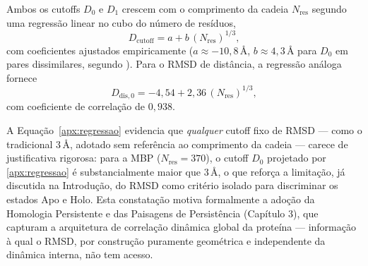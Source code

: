 \documentclass[12pt, a4paper]{article}
\theoremstyle{plain}
\theoremstyle{definition}
\theoremstyle{remark}
\newcommand{\ident}{\hspace{2em}}
\begin{document}
\ident Ambos os cutoffs $D_0$ e $D_1$ crescem com o comprimento da cadeia
$N_{\mathrm{res}}$ segundo uma regressão linear no cubo do número de
resíduos,
\begin{equation*}
    D_{\text{cutoff}} = a + b\,(N_{\mathrm{res}})^{1/3},
    \label{apx:regressao}
\end{equation*}
com coeficientes ajustados empiricamente ($a\approx -10{,}8\,\text{\AA}$,
$b\approx 4{,}3\,\text{\AA}$ para $D_0$ em pares dissimilares, segundo
\cite{maiorov1994}). Para o RMSD de distância, a regressão análoga fornece
\begin{equation*}
    D_{\mathrm{dis},0} = -4{,}54 + 2{,}36\,(N_{\mathrm{res}})^{1/3},
    \label{apx:regressao_dis}
\end{equation*}
com coeficiente de correlação de $0{,}938$.

\medskip
\noindent A Equação~\eqref{apx:regressao}
evidencia que \emph{qualquer} cutoff fixo de RMSD --- como o tradicional
$3\,\text{\AA}$, adotado sem referência ao comprimento da cadeia --- carece
de justificativa rigorosa: para a MBP ($N_{\mathrm{res}}=370$), o cutoff
$D_0$ projetado por \eqref{apx:regressao} é substancialmente maior que
$3\,\text{\AA}$, o que reforça a limitação, já discutida na Introdução, do
RMSD como critério isolado para discriminar os estados Apo e Holo. Esta
constatação motiva formalmente a adoção da Homologia Persistente e das
Paisagens de Persistência (Capítulo 3), que capturam a arquitetura de
correlação dinâmica global da proteína --- informação à qual o RMSD, por
construção puramente geométrica e independente da dinâmica interna, não tem
acesso.


\newpage
\nocite{*} 
\printbibliography[heading=bibintoc, title={Referências}]
\end{document}
